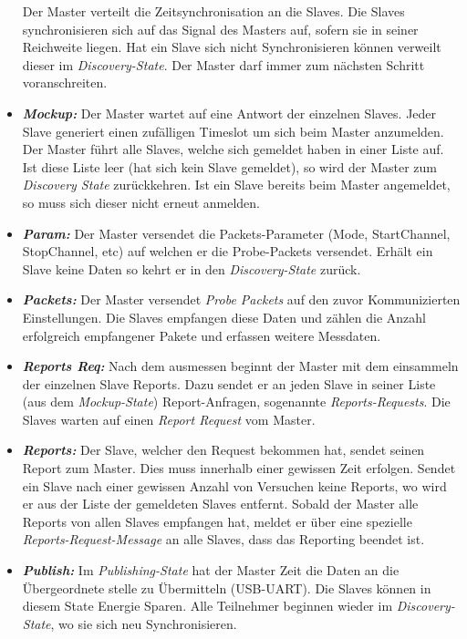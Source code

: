 \begin{itemize}
	
	Der Master verteilt die Zeitsynchronisation an die Slaves. Die Slaves synchronisieren sich auf das Signal des Masters auf, sofern sie in seiner Reichweite liegen. Hat ein Slave sich nicht Synchronisieren können verweilt dieser im \textit{Discovery-State}. Der Master darf immer zum nächsten Schritt voranschreiten. 
	\item \textbf{\textit{Mockup:}} Der Master wartet auf eine Antwort der einzelnen Slaves. Jeder Slave generiert einen zufälligen Timeslot um sich beim Master anzumelden. Der Master führt alle Slaves, welche sich gemeldet haben in einer Liste auf. Ist diese Liste leer (hat sich kein Slave gemeldet), so wird der Master zum \textit{Discovery State} zurückkehren. Ist ein Slave bereits beim Master angemeldet, so muss sich dieser nicht erneut anmelden. 
	\item \textbf{\textit{Param:}} Der Master versendet die Packets-Parameter (Mode, StartChannel, StopChannel, etc) auf welchen er die Probe-Packets versendet. Erhält ein Slave keine Daten so kehrt er in den \textit{Discovery-State} zurück. 
	\item \textbf{\textit{Packets:}} Der Master versendet \textit{Probe Packets} auf den zuvor Kommunizierten Einstellungen. Die Slaves empfangen diese Daten und zählen die Anzahl erfolgreich empfangener Pakete und erfassen weitere Messdaten. 
	\item  \textbf{\textit{Reports Req:}} Nach dem ausmessen beginnt der Master mit dem einsammeln der einzelnen Slave Reports. Dazu sendet er an jeden Slave in seiner Liste (aus dem \textit{Mockup-State}) Report-Anfragen, sogenannte \textit{Reports-Requests}. Die Slaves warten auf einen \textit{Report Request} vom Master. 
	\item  \textbf{\textit{Reports:}} Der Slave, welcher den Request bekommen hat, sendet seinen Report zum Master. Dies muss innerhalb einer gewissen Zeit erfolgen. Sendet ein Slave nach einer gewissen Anzahl von Versuchen keine Reports, wo wird er aus der Liste der gemeldeten Slaves entfernt. Sobald der Master alle Reports von allen Slaves empfangen hat, meldet er über eine spezielle \textit{Reports-Request-Message} an alle Slaves, dass das Reporting beendet ist.
	\item  \textbf{\textit{Publish:}} Im \textit{Publishing-State} hat der Master Zeit die Daten an die Übergeordnete stelle zu Übermitteln (USB-UART). Die Slaves können in diesem State Energie Sparen. Alle Teilnehmer beginnen wieder im \textit{Discovery-State}, wo sie sich neu Synchronisieren. 
\end{itemize}

